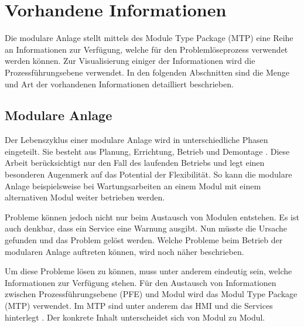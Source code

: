 \section{Vorhandene Informationen}
Die modulare Anlage stellt mittels des Module Type Package (MTP) eine Reihe an Informationen zur Verfügung, welche für den Problemlöseprozess verwendet werden können. Zur Visualisierung einiger der Informationen wird die Prozessführungsebene verwendet. In den folgenden Abschnitten sind die Menge und Art der vorhandenen Informationen detailliert beschrieben. 

\subsection{Modulare Anlage}
Der Lebenszyklus einer modulare Anlage wird in unterschiedliche Phasen eingeteilt. Sie besteht aus Planung, Errichtung, Betrieb und Demontage \cite{Obst2013}. Diese Arbeit berücksichtigt nur den Fall des laufenden Betriebs und legt einen besonderen Augenmerk auf das Potential der Flexibilität. So kann die modulare Anlage beispielsweise bei Wartungsarbeiten an einem Modul mit einem alternativen Modul weiter betrieben werden.

Probleme können jedoch nicht nur beim Austausch von Modulen entstehen. Es ist auch denkbar, dass ein Service eine Warnung ausgibt. Nun müsste die Ursache gefunden und das Problem gelöst werden. Welche Probleme beim Betrieb der modularen Anlage auftreten können, wird noch näher beschrieben.

Um diese Probleme lösen zu können, muss unter anderem eindeutig sein, welche Informationen zur Verfügung stehen. Für den Austausch von Informationen zwischen Prozessführungsebene (PFE) und Modul wird das Modul Type Package (MTP) verwendet. Im MTP sind unter anderem das HMI und die Services hinterlegt \cite{VDI2658-Blatt1}. Der konkrete Inhalt unterscheidet sich von Modul zu Modul.

